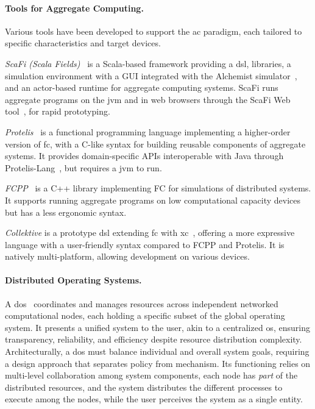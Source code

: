 \documentclass[12pt, a4paper]{article}
\begin{document}
\sloppypar
\paragraph{Tools for Aggregate Computing.}
Various tools have been developed to support the \ac{ac} paradigm,
each tailored to specific characteristics and target devices.

\emph{ScaFi (Scala Fields)}~\cite{scafi} is a Scala-based framework providing a \ac{dsl}, libraries,
a simulation environment with a GUI integrated with the Alchemist simulator~\cite{PianiniJOS2013},
and an actor-based runtime for aggregate computing systems.
%
ScaFi runs aggregate programs on the \ac{jvm} and in web browsers through the ScaFi Web tool~\cite{Coordination2021-scafiweb}, for rapid prototyping.

\emph{Protelis}~\cite{PianiniSAC2015} is a functional programming language implementing a higher-order version of \ac{fc},
with a C-like syntax for building reusable components of aggregate systems.
%
It provides domain-specific APIs interoperable with Java through Protelis-Lang~\cite{SASO2017-protelislang}, but requires a \ac{jvm} to run.

\emph{FCPP}~\cite{DBLP:journals/scp/AudritoT24} is a C++ library implementing FC for simulations of distributed systems.
%
It supports running aggregate programs on low computational capacity devices but has a less ergonomic syntax.

\emph{Collektive} is a prototype \ac{dsl} extending \ac{fc} with \ac{xc}~\cite{AudritoCDSV24},
offering a more expressive language with a user-friendly syntax compared to FCPP and Protelis.
%
It is natively multi-platform, allowing development on various devices.

\sloppypar
\paragraph{Distributed Operating Systems.}
A \ac{dos}~\cite{dos} coordinates and manages resources across independent networked computational nodes,
each holding a specific subset of the global operating system.
%
It presents a unified system to the user,
akin to a centralized \ac{os}, ensuring transparency, reliability, and efficiency despite resource distribution complexity.
%
%
Architecturally,
a \ac{dos} must balance individual and overall system goals,
requiring a design approach that separates policy from mechanism.
%
Its functioning relies on multi-level collaboration among system components,
each node has \emph{part} of the distributed resources, and the system distributes the different processes to execute among the nodes,
while the user perceives the system as a single entity.
\end{document}
